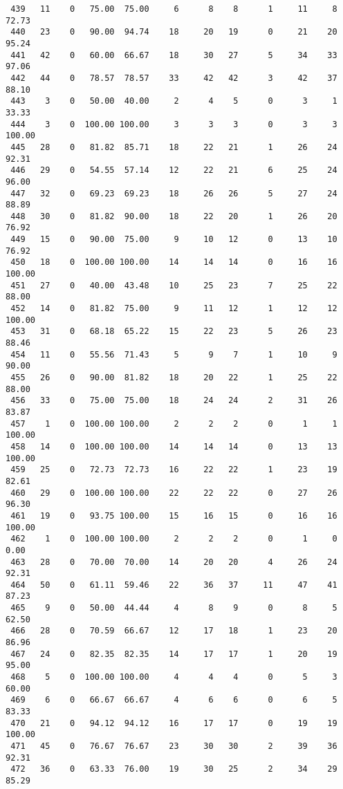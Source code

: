 \begin{verbatim}
 439   11    0   75.00  75.00     6      8    8      1     11     8    72.73
 440   23    0   90.00  94.74    18     20   19      0     21    20    95.24
 441   42    0   60.00  66.67    18     30   27      5     34    33    97.06
 442   44    0   78.57  78.57    33     42   42      3     42    37    88.10
 443    3    0   50.00  40.00     2      4    5      0      3     1    33.33
 444    3    0  100.00 100.00     3      3    3      0      3     3   100.00
 445   28    0   81.82  85.71    18     22   21      1     26    24    92.31
 446   29    0   54.55  57.14    12     22   21      6     25    24    96.00
 447   32    0   69.23  69.23    18     26   26      5     27    24    88.89
 448   30    0   81.82  90.00    18     22   20      1     26    20    76.92
 449   15    0   90.00  75.00     9     10   12      0     13    10    76.92
 450   18    0  100.00 100.00    14     14   14      0     16    16   100.00
 451   27    0   40.00  43.48    10     25   23      7     25    22    88.00
 452   14    0   81.82  75.00     9     11   12      1     12    12   100.00
 453   31    0   68.18  65.22    15     22   23      5     26    23    88.46
 454   11    0   55.56  71.43     5      9    7      1     10     9    90.00
 455   26    0   90.00  81.82    18     20   22      1     25    22    88.00
 456   33    0   75.00  75.00    18     24   24      2     31    26    83.87
 457    1    0  100.00 100.00     2      2    2      0      1     1   100.00
 458   14    0  100.00 100.00    14     14   14      0     13    13   100.00
 459   25    0   72.73  72.73    16     22   22      1     23    19    82.61
 460   29    0  100.00 100.00    22     22   22      0     27    26    96.30
 461   19    0   93.75 100.00    15     16   15      0     16    16   100.00
 462    1    0  100.00 100.00     2      2    2      0      1     0     0.00
 463   28    0   70.00  70.00    14     20   20      4     26    24    92.31
 464   50    0   61.11  59.46    22     36   37     11     47    41    87.23
 465    9    0   50.00  44.44     4      8    9      0      8     5    62.50
 466   28    0   70.59  66.67    12     17   18      1     23    20    86.96
 467   24    0   82.35  82.35    14     17   17      1     20    19    95.00
 468    5    0  100.00 100.00     4      4    4      0      5     3    60.00
 469    6    0   66.67  66.67     4      6    6      0      6     5    83.33
 470   21    0   94.12  94.12    16     17   17      0     19    19   100.00
 471   45    0   76.67  76.67    23     30   30      2     39    36    92.31
 472   36    0   63.33  76.00    19     30   25      2     34    29    85.29

\end{verbatim}
